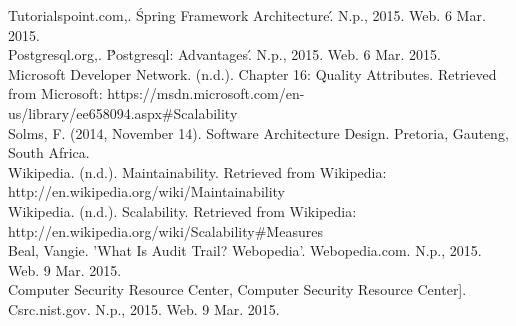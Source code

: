 Tutorialspoint.com,. \'Spring Framework Architecture\'. N.p., 2015. Web. 6 Mar. 2015. \\

Postgresql.org,. \'Postgresql: Advantages\'. N.p., 2015. Web. 6 Mar. 2015.\\

Microsoft Developer Network. (n.d.). Chapter 16: Quality Attributes. Retrieved from Microsoft: https://msdn.microsoft.com/en-us/library/ee658094.aspx#Scalability\\

Solms, F. (2014, November 14). Software Architecture Design. Pretoria, Gauteng, South Africa.\\

Wikipedia. (n.d.). Maintainability. Retrieved from Wikipedia: http://en.wikipedia.org/wiki/Maintainability\\

Wikipedia. (n.d.). Scalability. Retrieved from Wikipedia: http://en.wikipedia.org/wiki/Scalability#Measures\\

Beal, Vangie. 'What Is Audit Trail? Webopedia'. Webopedia.com. N.p., 2015. Web. 9 Mar. 2015.\\

Computer Security Resource Center, Computer Security Resource Center]. Csrc.nist.gov. N.p., 2015. Web. 9 Mar. 2015.\\
